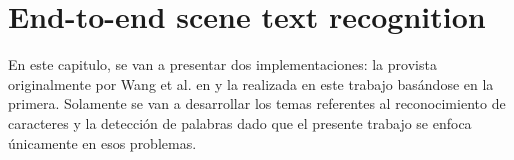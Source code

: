 \newpage	
\section{End-to-end scene text recognition}

	En este capitulo, se van a presentar dos implementaciones: la provista originalmente por Wang et al. en \cite{wang} y la realizada en este trabajo basándose en la primera. Solamente se van a desarrollar los temas referentes al reconocimiento de caracteres y la detección de palabras dado que el presente trabajo se enfoca únicamente en esos problemas.
	
		
	
	
	
	
	
	
